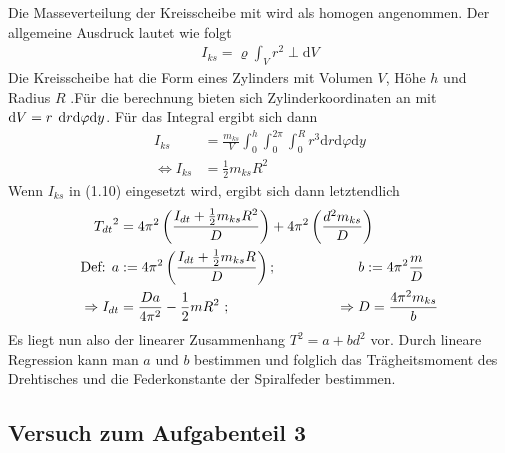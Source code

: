 \documentclass[11pt,a4paper]{article}
\begin{document}
Die Masseverteilung der Kreisscheibe mit wird als homogen angenommen. Der allgemeine Ausdruck lautet wie folgt
\begin{align*}
	I_{ks} = \varrho\int_{V}^{}r^2\perp\mathrm{d}V
\end{align*}
Die Kreisscheibe hat die Form eines Zylinders mit Volumen $V $, Höhe $h$ und Radius $R$ .Für die berechnung bieten sich Zylinderkoordinaten an mit $\mathrm{d}V=r\hspace{0.15cm}\mathrm{d}r\mathrm{d}\varphi\mathrm{d}y$.
Für das Integral ergibt sich dann
\begin{align*}
	I_{ks} &= \frac{m_{ks}}{V} \int_{0}^{h}\int_{0}^{2\pi}\int_{0}^{R} r^3 \mathrm{d}r\mathrm{d}\varphi\mathrm{d}y \\
	\Leftrightarrow I_{ks} &= \frac{1}{2} m_{ks}R^2
\end{align*}
Wenn $I_{ks}$ in (1.10) eingesetzt wird, ergibt sich dann letztendlich
\begin{align*}
	{T_{dt}}^2 &= 4 \pi^2 \left(\frac{I_{dt}+ \frac{1}{2} m_{ks}R^2}{D}\right) +4\pi^2 \left(\frac{d^2m_{ks}}{D}\right)\\
	\text{Def: } a&:= 4\pi^2\left(\frac{I_{dt}+\frac{1}{2}m_{ks}R}{D}\right) \text{;  } \hspace{2cm}b:= 4\pi^2\frac{m}{D}\\
	\Rightarrow I_{dt} &= \frac{Da}{4\pi^2}-\frac{1}{2}mR^2\text{ ; }\hspace{2.6cm}\Rightarrow D = \frac{4\pi^2 m_{ks}}{b}
\end{align*}
Es liegt nun also der linearer Zusammenhang $T^2=a+bd^2$ vor. Durch lineare Regression kann man $a$ und $b$ bestimmen und folglich das Trägheitsmoment des Drehtisches und die Federkonstante der Spiralfeder bestimmen.





\subsection{Versuch zum Aufgabenteil 3}
\end{document}
